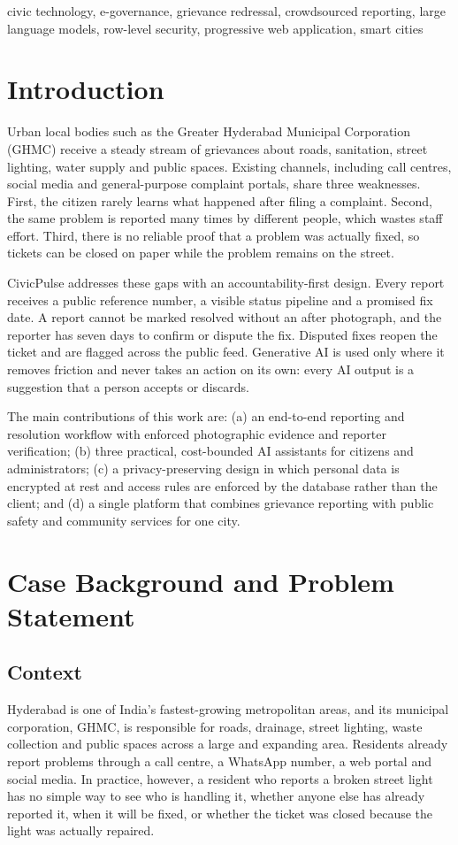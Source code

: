 \documentclass[conference]{IEEEtran}
\begin{document}
\begin{IEEEkeywords}
civic technology, e-governance, grievance redressal, crowdsourced reporting, large language models, row-level security, progressive web application, smart cities
\end{IEEEkeywords}
\section{Introduction}
Urban local bodies such as the Greater Hyderabad Municipal Corporation (GHMC) receive a steady stream of grievances about roads, sanitation, street lighting, water supply and public spaces. Existing channels, including call centres, social media and general-purpose complaint portals, share three weaknesses. First, the citizen rarely learns what happened after filing a complaint. Second, the same problem is reported many times by different people, which wastes staff effort. Third, there is no reliable proof that a problem was actually fixed, so tickets can be closed on paper while the problem remains on the street.

CivicPulse addresses these gaps with an accountability-first design. Every report receives a public reference number, a visible status pipeline and a promised fix date. A report cannot be marked resolved without an after photograph, and the reporter has seven days to confirm or dispute the fix. Disputed fixes reopen the ticket and are flagged across the public feed. Generative AI is used only where it removes friction and never takes an action on its own: every AI output is a suggestion that a person accepts or discards.

The main contributions of this work are: (a) an end-to-end reporting and resolution workflow with enforced photographic evidence and reporter verification; (b) three practical, cost-bounded AI assistants for citizens and administrators; (c) a privacy-preserving design in which personal data is encrypted at rest and access rules are enforced by the database rather than the client; and (d) a single platform that combines grievance reporting with public safety and community services for one city.

\section{Case Background and Problem Statement}
\subsection{Context}
Hyderabad is one of India's fastest-growing metropolitan areas, and its municipal corporation, GHMC, is responsible for roads, drainage, street lighting, waste collection and public spaces across a large and expanding area. Residents already report problems through a call centre, a WhatsApp number, a web portal and social media. In practice, however, a resident who reports a broken street light has no simple way to see who is handling it, whether anyone else has already reported it, when it will be fixed, or whether the ticket was closed because the light was actually repaired.
\end{document}
